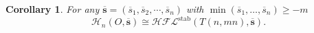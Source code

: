 \documentclass{amsart}
\newtheorem{corollary}[theorem]{Corollary}
\newcommand{\cHFL}{\mathcal{H\!F\! L}}
\newcommand{\ovl}{\overline}
\newcommand{\HD}{\mathcal{H}}
\newcommand{\A}{\mathfrak{A}}
\newcommand{\stab}{\mathrm{stab}}
\renewcommand{\ss}{\mathbf{s}}
\begin{document}






\begin{corollary}
\label{cor: homology stabilize}
For any $\overline{\ss}=(\ovl{s}_1,\ovl{s}_2,\cdots,\ovl{s}_n)$ with $\min(\ovl{s}_1,\ldots,\ovl{s}_n)\ge -m$
\[\HD_n(O,\ovl{\ss})\cong \cHFL^{\stab}(T(n,mn),\ovl{\ss}).\]

\end{corollary}
\end{document}
